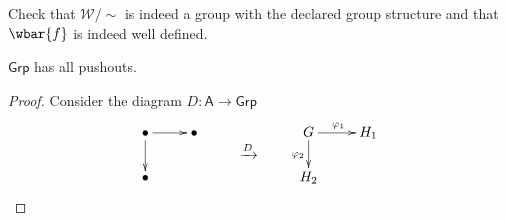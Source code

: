 \begin{exercise}
	Check that $\mathcal{W}/{\sim}$ is indeed a group with the declared group structure and that $\wbar{f}$ is indeed well defined.
\end{exercise}

\begin{proposition}
	$\mathsf{Grp}$ has all pushouts.	
\end{proposition}

\begin{proof}
	Consider the diagram $D : \mathsf{A} \to \mathsf{Grp}$
	\begin{equation*}
		\xymatrix@R=0pc{
			\bullet \ar[r]\ar[dd] & \bullet & & G \ar[r]^{\varphi_1}\ar[dd]_{\varphi_2} & H_1\\
			& & \xrightarrow{D}\\
			\bullet & & & H_2
		}
	\end{equation*}
\end{proof}
